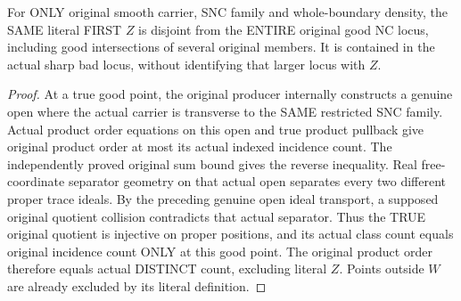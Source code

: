 \begin{theorem}
\label{hir:sharp-original-distinct-defect-disjoint-entire-good-locus}
\leanok
For ONLY original smooth carrier, SNC family and whole-boundary density,
the SAME literal FIRST $Z$ is disjoint from the ENTIRE original good NC locus,
including good intersections of several original members. It is contained
in the actual sharp bad locus, without identifying that larger locus with $Z$.
\end{theorem}
\begin{proof}
At a true good point, the original producer internally constructs a genuine
open where the actual carrier is transverse to the SAME restricted SNC family.
Actual product order equations on this open and true product pullback give
original product order at most its actual indexed incidence count. The
independently proved original sum bound gives the reverse inequality. Real
free-coordinate separator geometry on that actual open separates every two
different proper trace ideals. By the preceding genuine open ideal transport,
a supposed original quotient collision contradicts that actual separator.
Thus the TRUE original quotient is injective on proper positions, and its
actual class count equals original incidence count ONLY at this good point.
The original product order therefore equals actual DISTINCT count, excluding
literal $Z$. Points outside $W$ are already excluded by its literal definition.
\end{proof}

